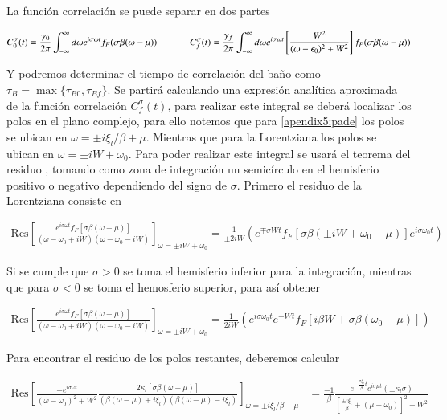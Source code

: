 \begin{appendixs}
La función correlación se puede separar en dos partes

\begin{equation*}
    C^{\sigma}_{0}(t) = \frac{\gamma_{0}}{2\pi} \int_{-\infty}^{\infty}d\omega e^{i\sigma \omega t} f_{F}(\sigma \beta (\omega-\mu)) \hspace{12mm} C^{\sigma}_{f}(t) = \frac{\gamma_{f}}{2\pi} \int_{-\infty}^{\infty}d\omega e^{i\sigma \omega t}\left[ \frac{W^{2}}{(\omega-\epsilon_{0})^{2} + W^{2}} \right] f_{F}(\sigma \beta (\omega-\mu))
\end{equation*}

Y podremos determinar el tiempo de correlación del baño como $\tau_{B} = \max\{\tau_{B0},\tau_{Bf}\}$. Se partirá calculando una expresión analítica aproximada de la función correlación $C^{\sigma}_{f}(t)$, para realizar este integral se deberá localizar los polos en el plano complejo, para ello notemos que para \ref{apendix5:pade} los polos se ubican en $\omega = \pm i \xi_{l}/\beta + \mu $. Mientras que para la Lorentziana los polos se ubican en $\omega = \pm i W + \omega_{0}$. Para poder realizar este integral se usará el teorema del residuo \cite{riley2006mathematical}, tomando como zona de integración un semicírculo en el hemisferio positivo o negativo dependiendo del signo de $\sigma$. Primero el residuo de la Lorentziana consiste en 

\begin{align*}
   \text{Res} \left[ \frac{e^{ i\sigma \omega t} f_{F}[\sigma \beta (\omega-\mu)] }{ (\omega-\omega_{0} + iW)(\omega -\omega_{0} -iW)}\right]_{\omega = \pm i W + \omega_{0}} = \frac{1}{\pm 2iW} ( e^{\mp \sigma Wt} f_{F}[\sigma \beta(\pm iW +\omega_{0}-\mu)]e^{i\sigma \omega_{0}t}) 
\end{align*}

Si se cumple que $\sigma > 0$ se toma el hemisferio inferior para la integración, mientras que para $\sigma<0$ se toma el hemosferio superior, para así obtener 

\begin{align*}
    \text{Res} \left[ \frac{e^{ i\sigma \omega t} f_{F}[\sigma \beta (\omega-\mu)] }{ (\omega-\omega_{0} + iW)(\omega -\omega_{0} -iW)}\right]_{\omega = \pm i W + \omega_{0}} = \frac{1}{ 2iW} ( e^{i\sigma \omega_{0}t}e^{- Wt} f_{F}[i\beta W + \sigma \beta(\omega_{0}-\mu)]) 
 \end{align*}

Para encontrar el residuo de los polos restantes, deberemos calcular 

\begin{align*}
    \text{Res} \left[ \frac{-e^{i\sigma \omega t}}{(\omega - \omega_{0})^{2} + W^{2} } \frac{ 2\kappa_{l}[\sigma \beta (\omega-\mu)] }{ (\beta(\omega-\mu) + i \xi_{l} )(\beta(\omega-\mu) - i \xi_{l})} \right]_{\omega = \pm i \xi_{l}/\beta + \mu} & = \frac{-1}{\beta} \frac{e^{- \frac{\sigma \xi_{l}}{\beta}t} e^{i\sigma \mu t}(\pm \kappa_{l}\sigma )}{ [ \frac{ \pm i\xi_{l}}{\beta} + (\mu - \omega_{0}) ]^{2} + W^{2} } 
\end{align*}


\end{appendixs}
